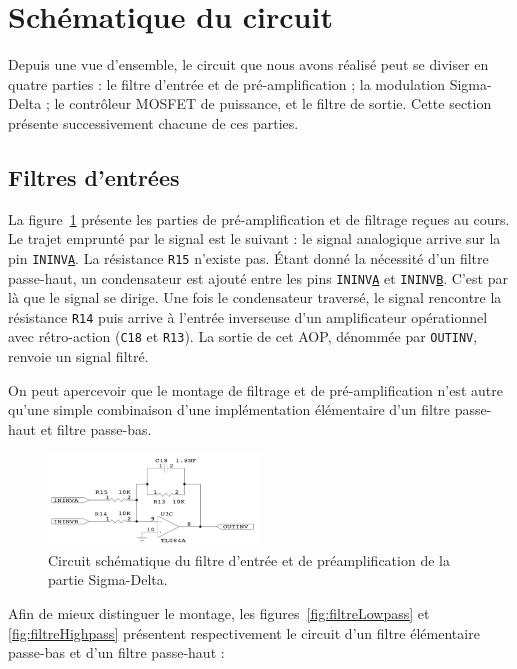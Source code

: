 \documentclass[10pt, oneside, a4paper]{article}
\begin{document}
\section{Schématique du circuit}
Depuis une vue d'ensemble, le circuit que nous avons réalisé peut se diviser en quatre parties : le filtre d'entrée et de pré-amplification ; la modulation Sigma-Delta ; le contrôleur MOSFET de puissance, et le filtre de sortie.
Cette section présente successivement chacune de ces parties.

\subsection{Filtres d'entrées}
La figure~\ref{fig:schemaPreAmpli} présente les parties de pré-amplification et de filtrage reçues au cours.
Le trajet emprunté par le signal est le suivant : le signal analogique arrive sur la pin \texttt{ININV\underline{A}}.
La résistance \texttt{R15} n'existe pas.
Étant donné la nécessité d'un filtre passe-haut, un condensateur est ajouté entre les pins \texttt{ININV\underline{A}} et \texttt{ININV\underline{B}}.
C'est par là que le signal se dirige.
Une fois le condensateur traversé, le signal rencontre la résistance \texttt{R14} puis arrive à l'entrée inverseuse d'un amplificateur opérationnel avec rétro-action (\texttt{C18} et \texttt{R13}).
La sortie de cet AOP, dénommée par \texttt{OUTINV}, renvoie un signal filtré.

On peut apercevoir que le montage de filtrage et de pré-amplification n'est autre qu'une simple combinaison d'une implémentation élémentaire d'un filtre passe-haut et filtre passe-bas.
\begin{figure}[!ht]
    \centering
    \includegraphics[width=0.5\textwidth]{image/schematique-all.jpg}
    \caption{Circuit schématique du filtre d'entrée et de préamplification de la partie
             Sigma-Delta.}
    \label{fig:schemaPreAmpli}
\end{figure}

Afin de mieux distinguer le montage, les figures~\ref{fig:filtreLowpass} et \ref{fig:filtreHighpass} présentent respectivement le circuit d'un filtre élémentaire passe-bas et d'un filtre passe-haut :
\end{document}
